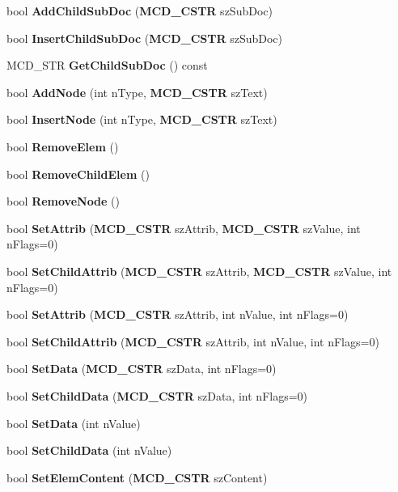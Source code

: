 \begin{CompactItemize}
bool {\bf AddChildSubDoc} ({\bf MCD\_\-CSTR} szSubDoc)
\item 
bool {\bf InsertChildSubDoc} ({\bf MCD\_\-CSTR} szSubDoc)
\item 
MCD\_\-STR {\bf GetChildSubDoc} () const 
\item 
bool {\bf AddNode} (int nType, {\bf MCD\_\-CSTR} szText)
\item 
bool {\bf InsertNode} (int nType, {\bf MCD\_\-CSTR} szText)
\item 
bool {\bf RemoveElem} ()
\item 
bool {\bf RemoveChildElem} ()
\item 
bool {\bf RemoveNode} ()
\item 
bool {\bf SetAttrib} ({\bf MCD\_\-CSTR} szAttrib, {\bf MCD\_\-CSTR} szValue, int nFlags=0)
\item 
bool {\bf SetChildAttrib} ({\bf MCD\_\-CSTR} szAttrib, {\bf MCD\_\-CSTR} szValue, int nFlags=0)
\item 
bool {\bf SetAttrib} ({\bf MCD\_\-CSTR} szAttrib, int nValue, int nFlags=0)
\item 
bool {\bf SetChildAttrib} ({\bf MCD\_\-CSTR} szAttrib, int nValue, int nFlags=0)
\item 
bool {\bf SetData} ({\bf MCD\_\-CSTR} szData, int nFlags=0)
\item 
bool {\bf SetChildData} ({\bf MCD\_\-CSTR} szData, int nFlags=0)
\item 
bool {\bf SetData} (int nValue)
\item 
bool {\bf SetChildData} (int nValue)
\item 
bool {\bf SetElemContent} ({\bf MCD\_\-CSTR} szContent)
\end{CompactItemize}
